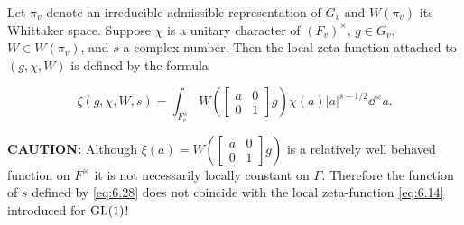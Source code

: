 \begin{definition}\label{def:6.11}

Let $\pi_v$ denote an irreducible admissible representation of $G_v$ and $W(\pi_v)$ its Whittaker space. Suppose $\chi$ is a unitary character of $(F_v)^{\times}$, $g \in G_v$, $W \in W(\pi_v)$, and $s$ a complex number. Then the local zeta function attached to $(g, \chi, W)$ is defined by the formula

\begin{equation}\label{eq:6.28}
\zeta(g, \chi, W, s) = \int_{F_v^{\times}} W\!\left(\begin{bmatrix} a & 0 \\ 0 & 1 \end{bmatrix} g\right) \chi(a) |a|^{s - 1/2} \dd^{\times} a.\tag{6.28}
\end{equation}

\end{definition}

\textbf{CAUTION:} Although $\xi(a) = W\!\left(\begin{bmatrix} a & 0 \\ 0 & 1 \end{bmatrix}g\right)$ is a relatively well behaved function on $F^{\times}$ it is not necessarily locally constant on $F$. Therefore the function of $s$ defined by \eqref{eq:6.28} does not coincide with the local zeta-function \eqref{eq:6.14} introduced for $\operatorname{GL}(1)$!

